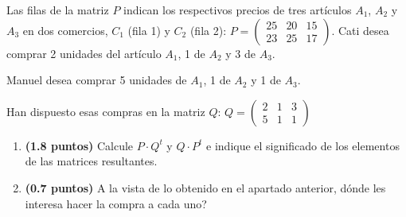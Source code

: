 
Las filas de la matriz $P$ indican los respectivos precios de tres artículos $A_1$, $A_2$ y $A_3$ en dos comercios, $C_1$ (fila 1) y $C_2$ (fila 2): $P=\begin{pmatrix}25&20&15\\23&25&17\end{pmatrix}$.
Cati desea comprar 2 unidades del artículo $A_1$, 1 de $A_2$ y 3 de $A_3$.

Manuel desea comprar 5 unidades de $A_1$, 1 de $A_2$ y 1 de $A_3$.

Han dispuesto esas compras en la matriz $Q$: $Q=\begin{pmatrix}2&1&3\\5&1&1\end{pmatrix}$
\begin{enumerate}[label=\alph*)]
\item \textbf{(1.8 puntos)} Calcule $P\cdot Q^t$ y $Q\cdot P^t$ e indique el significado de los elementos de las matrices resultantes.
\item \textbf{(0.7 puntos)} A la vista de lo obtenido en el apartado anterior, \textquestiondown{}dónde les interesa hacer la compra a cada uno?
\end{enumerate}
